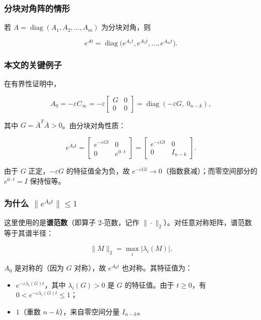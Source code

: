 \documentclass[UTF8,fontset=fandol]{ctexart}
\begin{document}
\subsubsection*{分块对角阵的情形}

若 $A = \operatorname{diag}(A_1, A_2, \dots, A_m)$ 为分块对角，则

\[
e^{At} = \operatorname{diag}\bigl(e^{A_1 t}, e^{A_2 t}, \dots, e^{A_m t}\bigr).
\]

\subsubsection*{本文的关键例子}

在有界性证明中，

\[
A_0 = -\varepsilon C_\infty
= -\varepsilon \begin{bmatrix} G & 0 \\ 0 & 0 \end{bmatrix}
= \operatorname{diag}(-\varepsilon G,\; 0_{n-k}),
\]

其中 $G = \bar{A}^T\bar{A} > 0$。由分块对角性质：

\[
e^{A_0 t} = \begin{bmatrix} e^{-\varepsilon G t} & 0 \\ 0 & e^{0 \cdot t} \end{bmatrix}
= \begin{bmatrix} e^{-\varepsilon G t} & 0 \\ 0 & I_{n-k} \end{bmatrix}.
\]

由于 $G$ 正定，$-\varepsilon G$ 的特征值全为负，故 $e^{-\varepsilon G t} \to 0$（指数衰减）；而零空间部分的 $e^{0\cdot t} = I$ 保持恒等。

\subsubsection*{为什么 $\|e^{A_0 t}\| \leq 1$}

这里使用的是\textbf{谱范数}（即算子 2-范数，记作 $\|\cdot\|_2$）。对任意对称矩阵，谱范数等于其谱半径：

\[
\|M\|_2 = \max_{i} |\lambda_i(M)|.
\]

$A_0$ 是对称的（因为 $G$ 对称），故 $e^{A_0 t}$ 也对称。其特征值为：

\begin{itemize}
  \item $e^{-\varepsilon \lambda_i(G) t}$，其中 $\lambda_i(G) > 0$ 是 $G$ 的特征值。由于 $t \geq 0$，有 $0 < e^{-\varepsilon \lambda_i(G) t} \leq 1$；
  \item $1$（重数 $n-k$），来自零空间分量 $I_{n-k}$。
\end{itemize}
\end{document}
